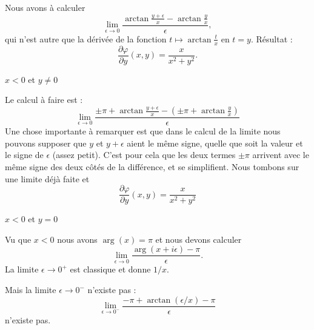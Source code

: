 \begin{normaltext}
\begin{subproof}
            Nous avons à calculer
            \begin{equation}
                \lim_{\epsilon\to 0}\frac{ \arctan\frac{ y+\epsilon }{ x }-\arctan\frac{ y }{ x } }{ \epsilon },
            \end{equation}
            qui n'est autre que la dérivée de la fonction \( t\mapsto\arctan\frac{ t }{ x }\) en \( t=y\). Résultat :
            \begin{equation}
                \frac{ \partial \varphi }{ \partial y }(x,y)=\frac{ x }{ x^2+y^2 }.
            \end{equation}
            
        \item[\( x<0  \) et \( y\neq 0\)]

            Le calcul à faire est :
            \begin{equation}
                \lim_{\epsilon\to 0}\frac{ \pm\pi+\arctan\frac{ y+\epsilon }{ x }-\left( \pm\pi+\arctan\frac{ y }{ x } \right) }{ \epsilon }
            \end{equation}
            Une chose importante à remarquer est que dans le calcul de la limite nous pouvons supposer que \( y\) et \( y+\epsilon\) aient le même signe, quelle que soit la valeur et le signe de \( \epsilon\) (assez petit). C'est pour cela que les deux termes \( \pm\pi\) arrivent avec le même signe des deux côtés de la différence, et se simplifient. Nous tombons sur une limite déjà faite et
            \begin{equation}
                \frac{ \partial \varphi }{ \partial y }(x,y)=\frac{ x }{ x^2+y^2 }
            \end{equation}
            
        \item[\( x<0\) et \( y=0\)]

            Vu que \( x<0\) nous avons \( \arg(x)=\pi\) et nous devons calculer
            \begin{equation}
                \lim_{\epsilon\to 0}\frac{ \arg(x+i\epsilon)-\pi }{ \epsilon }.
            \end{equation}
            La limite \( \epsilon\to 0^+\) est classique et donne \( 1/x\).

            Mais la limite \( \epsilon\to 0^-\) n'existe pas :
            \begin{equation}
                \lim_{\epsilon\to 0^-}\frac{ -\pi+\arctan(\epsilon/x)-\pi }{ \epsilon }
            \end{equation}
            n'existe pas.


\end{subproof}
\end{normaltext}
